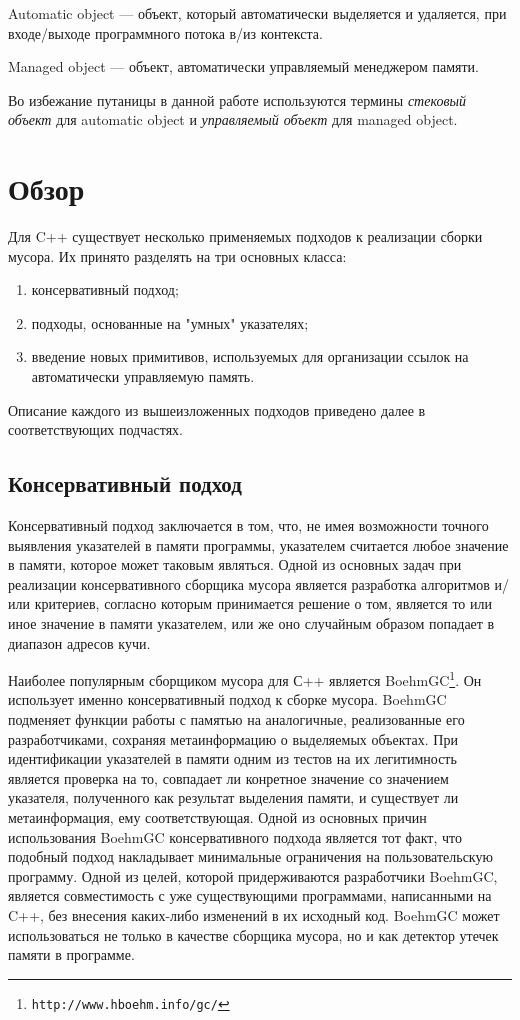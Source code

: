 Automatic object --- объект, который автоматически выделяется и удаляется, при входе/выходе программного потока в/из контекста.

Managed object --- объект, автоматически управляемый менеджером памяти.

Во избежание путаницы в данной работе используются термины \textit{стековый объект} для automatic object
и \textit{управляемый объект} для managed object.

\section{Обзор}

Для C++ существует несколько применяемых подходов к реализации сборки мусора.
Их принято разделять на три основных класса\cite{CppArt}:
\begin{enumerate}
\item консервативный подход;
\item подходы, основанные на "умных" указателях;
\item введение новых примитивов, используемых для организации ссылок на автоматически управляемую память.
\end{enumerate}
Описание каждого из вышеизложенных подходов приведено далее в соответствующих подчастях.

\subsection{Консервативный подход}
Консервативный подход заключается в том, что, не имея возможности точного выявления указателей в памяти программы,
указателем считается любое значение в памяти, которое может таковым являться.
Одной из основных задач при реализации консервативного сборщика мусора является разработка алгоритмов
и/или критериев, согласно которым принимается решение о том, является то или иное значение в памяти указателем,
или же оно случайным образом попадает в диапазон адресов кучи.

Наиболее популярным сборщиком мусора для С++ является BoehmGC\footnote{\texttt{http://www.hboehm.info/gc/}}.
Он использует именно консервативный подход к сборке мусора.
BoehmGC подменяет функции работы с памятью на аналогичные, реализованные его разработчиками,
сохраняя метаинформацию о выделяемых объектах.
При идентификации указателей в памяти одним из тестов на их легитимность является проверка
на то, совпадает ли конретное значение со значением указателя, полученного как результат
выделения памяти, и существует ли метаинформация, ему соответствующая.
Одной из основных причин использования BoehmGC консервативного подхода является тот факт,
что подобный подход накладывает минимальные ограничения на пользовательскую программу.
Одной из целей, которой придерживаются разработчики BoehmGC, является совместимость с уже существующими
программами, написанными на C++, без внесения каких-либо изменений в их исходный код\cite{BoehmTransGC}.
BoehmGC может использоваться не только в качестве сборщика мусора, но и как детектор утечек памяти в программе.

